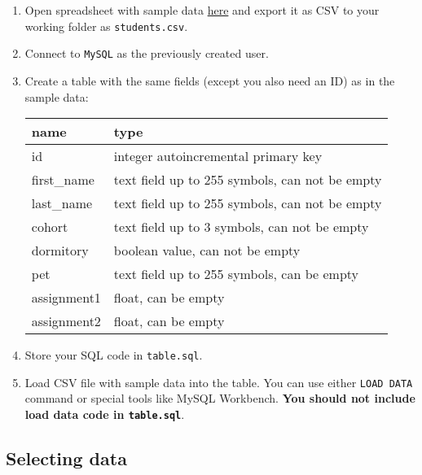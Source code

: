 \documentclass[12pt]{article}
\newcommand{\code}[1]{\texttt{#1}}
\begin{document}
\begin{enumerate}
\item Open spreadsheet with sample data \href{https://docs.google.com/spreadsheets/d/1fnpOlVMEQZJb3E07pDOHItz0ckAT2glQu6Vu9-_axvo/edit?usp=sharing}{here} and export it as CSV to your working folder as  \code{students.csv}.
\item Connect to \code{MySQL} as the previously created user.
\item Create a table with the same fields (except you also need an ID) as in the sample data:

\begin{tabular}{| l | l | }
  \hline
  \textbf{name} & \textbf{type} \\
  \hline
  id & integer autoincremental primary key \\
  first\_name & text field up to 255 symbols, can not be empty \\
  last\_name & text field up to 255 symbols, can not be empty \\
  cohort & text field up to 3 symbols, can not be empty \\
  dormitory & boolean value, can not be empty \\
  pet  & text field up to 255 symbols, can be empty \\
  assignment1  & float, can be empty \\
  assignment2  & float, can be empty \\
  \hline
\end{tabular}

\item Store your SQL code in \code{table.sql}.

\item Load CSV file with sample data into the table. You can use either \code{LOAD DATA} command or special tools like MySQL Workbench. \textbf{You should not include load data code in \code{table.sql}}.


\end{enumerate}

\subsection*{Selecting data}
\end{document}
